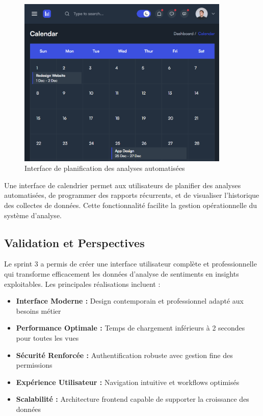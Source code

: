 \begin{figure}[H]
\centering
\includegraphics[width=0.9\textwidth]{assets/images/calendar.png}
\caption{Interface de planification des analyses automatisées}
\label{fig:analysis-calendar}
\end{figure}

Une interface de calendrier permet aux utilisateurs de planifier des analyses automatisées, de programmer des rapports récurrents, et de visualiser l'historique des collectes de données. Cette fonctionnalité facilite la gestion opérationnelle du système d'analyse.

\subsection{Validation et Perspectives}

Le sprint 3 a permis de créer une interface utilisateur complète et professionnelle qui transforme efficacement les données d'analyse de sentiments en insights exploitables. Les principales réalisations incluent :

\begin{itemize}
    \item \textbf{Interface Moderne :} Design contemporain et professionnel adapté aux besoins métier
    \item \textbf{Performance Optimale :} Temps de chargement inférieurs à 2 secondes pour toutes les vues
    \item \textbf{Sécurité Renforcée :} Authentification robuste avec gestion fine des permissions
    \item \textbf{Expérience Utilisateur :} Navigation intuitive et workflows optimisés
    \item \textbf{Scalabilité :} Architecture frontend capable de supporter la croissance des données
\end{itemize}

